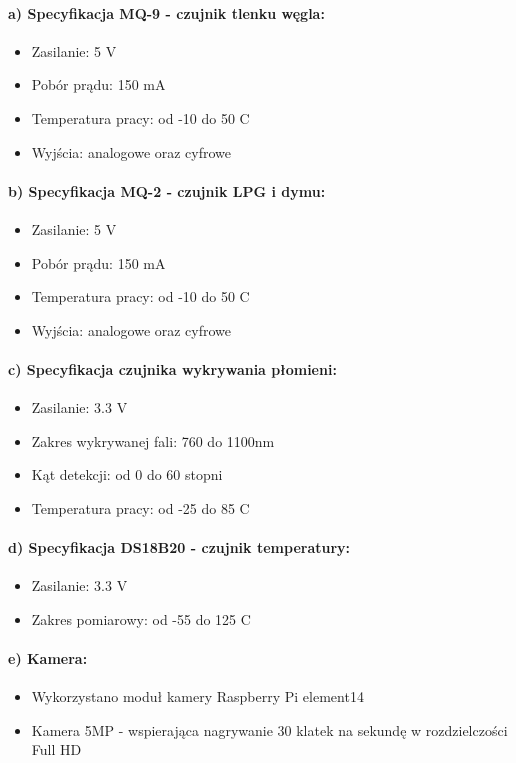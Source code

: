 \paragraph{a) Specyfikacja MQ-9 - czujnik tlenku węgla\cite{specyfikacjaMQ-9}:}
\begin{itemize} 
\item Zasilanie: 5 V
\item Pobór prądu: 150 mA
\item Temperatura pracy: od -10 do 50 \textdegree{}C
\item Wyjścia: analogowe oraz cyfrowe
\end{itemize}
\paragraph{b) Specyfikacja MQ-2 \cite{specyfikacjaMQ-2} - czujnik LPG i dymu:}
\begin{itemize} 
\item Zasilanie: 5 V
\item Pobór prądu: 150 mA
\item Temperatura pracy: od -10 do 50 \textdegree{}C
\item Wyjścia: analogowe oraz cyfrowe
\end{itemize}
\paragraph{c) Specyfikacja czujnika wykrywania płomieni\cite{specyfikacjaFlame}:}
\begin{itemize} 
\item Zasilanie: 3.3 V
\item Zakres wykrywanej fali: 760 do 1100nm
\item Kąt detekcji: od 0 do 60 stopni
\item Temperatura pracy: od -25 do 85 \textdegree{}C
\end{itemize}
\paragraph{d) Specyfikacja DS18B20 - czujnik temperatury\cite{specyfikacjaTemp}:}
\begin{itemize} 
\item Zasilanie: 3.3 V
\item Zakres pomiarowy: od -55 do 125 \textdegree{}C
\end{itemize}
\paragraph{e) Kamera:}
\begin{itemize} 
\item Wykorzystano moduł kamery Raspberry Pi element14
\item Kamera 5MP - wspierająca nagrywanie 30 klatek na sekundę w rozdzielczości Full HD
\end{itemize}
